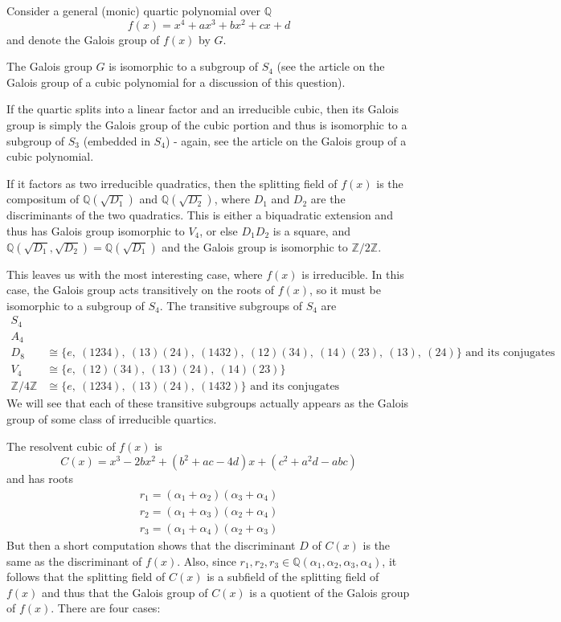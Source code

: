 \documentclass[12pt]{article}
\newcommand{\Rats}{\mathbb{Q}}
\newcommand{\Ints}{\mathbb{Z}}
\begin{document}
Consider a general (monic) quartic polynomial over $\Rats$
\[f(x)=x^4 + ax^3+bx^2+cx+d\]
and denote the Galois group of $f(x)$ by $G$.

The Galois group $G$ is isomorphic to a subgroup of $S_4$ (see the article on the Galois group of a cubic polynomial for a discussion of this question). 

If the quartic splits into a linear factor and an irreducible cubic, then its Galois group is simply the Galois group of the cubic portion and thus is isomorphic to a subgroup of $S_3$ (embedded in $S_4$) - again, see the article on the Galois group of a cubic polynomial.

If it factors as two irreducible quadratics, then the splitting field of $f(x)$ is the compositum of $\Rats(\sqrt{D_1})$ and $\Rats(\sqrt{D_2})$, where $D_1$ and $D_2$ are the discriminants of the two quadratics. This is either a biquadratic extension and thus has Galois group isomorphic to $V_4$, or else $D_1D_2$ is a square, and $\Rats(\sqrt{D_1},\sqrt{D_2})=\Rats(\sqrt{D_1})$ and the Galois group  is isomorphic to $\Ints/2\Ints$.

This leaves us with the most interesting case, where $f(x)$ is irreducible. In this case, the Galois group acts transitively on the roots of $f(x)$, so it must be isomorphic to a  subgroup of $S_4$. The transitive subgroups of $S_4$ are
\begin{align*}
S_4&\\
A_4&\\
D_8&\cong\{e,\ (1234),\ (13)(24),\ (1432),\ (12)(34),\ (14)(23),\ (13),\ (24)\}\text{ and its conjugates}\\
V_4&\cong\{e,\ (12)(34),\ (13)(24),\ (14)(23)\}\\
\Ints/4\Ints &\cong \{e,\ (1234),\ (13)(24),\ (1432)\}\text{ and its conjugates}
\end{align*}
We will see that each of these transitive subgroups actually appears as the Galois group of some class of irreducible quartics.

The resolvent cubic of $f(x)$ is
\[C(x) = x^3 - 2b x^2 + (b^2+ac-4d) x + (c^2+a^2d - abc)\]
and has roots
\begin{gather*}
r_1=(\alpha_1+\alpha_2)(\alpha_3+\alpha_4)\\
r_2=(\alpha_1+\alpha_3)(\alpha_2+\alpha_4)\\
r_3=(\alpha_1+\alpha_4)(\alpha_2+\alpha_3)
\end{gather*}
But then a short computation shows that the discriminant $D$ of $C(x)$ is the same as the discriminant of $f(x)$. Also, since $r_1,r_2,r_3\in\Rats(\alpha_1,\alpha_2,\alpha_3,\alpha_4)$, it follows that the splitting field of $C(x)$ is a subfield of the splitting field of $f(x)$ and thus that the Galois group of $C(x)$ is a quotient of the Galois group of $f(x)$. There are four cases:
\end{document}
